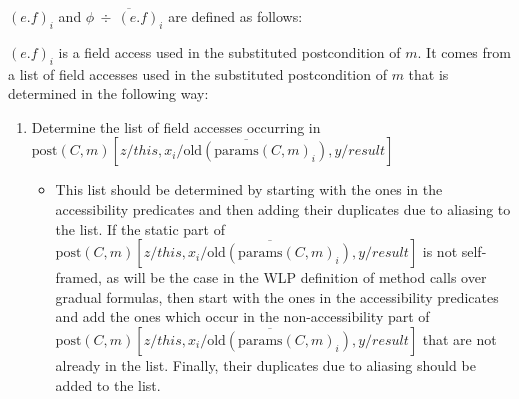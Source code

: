 \documentclass {article}
\newcommand{\fphi}{\widehat{\phi}}
\newcommand{\postsub}{\text{post}(C,m)\left[z/this, \overline{x_i/\text{old}(\text{params}(C,m)_i)},y/result\right]}
\begin{document}
$(e.f)_i$ and $\phi \overline{\ \div \ (e.f)_i}$ are defined as follows:

$(e.f)_i$ is a field access used in the substituted postcondition of $m$. It comes from a list of field accesses used in the substituted postcondition of $m$ that is determined in the following way:
\begin{enumerate}
\item Determine the list of field accesses occurring in $\postsub$
	\begin{itemize}
	\item This list should be determined by starting with the ones in the accessibility predicates and then adding their duplicates due to aliasing to the list. If the static part of $\postsub$ is not self-framed, as will be the case in the WLP definition of method calls over gradual formulas, then start with the ones in the accessibility predicates and add the ones which occur in the non-accessibility part of $\postsub$ that are not already in the list. Finally, their duplicates due to aliasing should be added to the list.
	\end{itemize}
\end{enumerate} 
\end{document}
